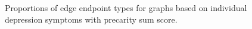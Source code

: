 \documentclass[
]{article}
\begin{document}
\begin{figure}


\caption{\label{fig-presum-mat}Proportions of edge endpoint types for
graphs based on individual depression symptoms with precarity sum
score.}

\end{figure}%
\end{document}
